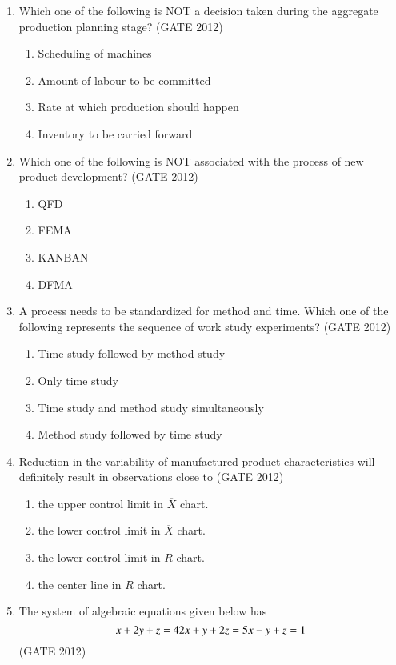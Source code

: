 \documentclass[journal,12pt,onecolumn]{IEEEtran}
\theoremstyle{remark}
\begin{document}
\begin{enumerate}
\vspace{1cm}
\item  Which one of the following is NOT a decision taken during the aggregate production planning stage?
\hfill{(GATE 2012)}

\begin{enumerate}
\item Scheduling of machines
\item Amount of labour to be committed
\item Rate at which production should happen
\item Inventory to be carried forward
\end{enumerate}

\vspace{1cm}
\item  Which one of the following is NOT associated with the process of new product development?
\hfill{(GATE 2012)}

\begin{enumerate}
\item QFD
\item FEMA
\item KANBAN
\item DFMA
\end{enumerate}
\vspace{1cm}
\item  A process needs to be standardized for method and time. Which one of the following represents the sequence of work study experiments?
\hfill{(GATE 2012)}

\begin{enumerate}
\item Time study followed by method study
\item Only time study
\item Time study and method study simultaneously
\item Method study followed by time study
\end{enumerate}

\vspace{1cm}
\item  Reduction in the variability of manufactured product characteristics will definitely result in observations close to
\hfill{(GATE 2012)}

\begin{enumerate}
\item the upper control limit in $\overline{X}$ chart.
\item the lower control limit in $\overline{X}$ chart.
\item the lower control limit in $R$ chart.
\item the center line in $R$ chart.
\end{enumerate}
\newpage
\vspace{1cm}
\item  The system of algebraic equations given below has
\[
x + 2y + z = 4 \\
2x + y + 2z = 5 \\
x - y + z = 1
\]
\hfill{(GATE 2012)}


\end{enumerate}
\end{document}
